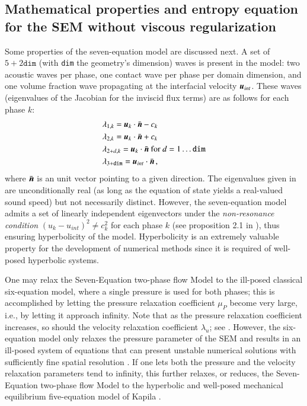 \subsection{Mathematical properties and entropy equation for the SEM without viscous regularization}\label{eq:sem-ent-wv}
Some properties of the seven-equation model are discussed next. A set of $5+2\texttt{dim}$ (with \texttt{dim} the geometry's dimension) waves 
is present in the model: two acoustic waves per phase, one contact wave per phase per domain dimension, and one volume fraction wave propagating 
at the interfacial velocity $\boldsymbol u_{int}$. These waves (eigenvalues of the Jacobian for the inviscid flux terms) are as follows for each phase $k$:
% 
\begin{align}\label{eq:eigenvalues}
&\lambda_{1,k} = \boldsymbol u_k \cdot \bar{\boldsymbol n} - c_k \nonumber\\
&\lambda_{2,k} = \boldsymbol u_k \cdot \bar{\boldsymbol n} + c_k \nonumber\\
&\lambda_{2+d,k} = \boldsymbol u_k \cdot \bar{\boldsymbol n} \text{ for } d = 1 \dots \texttt{dim} \\
&\lambda_{3+\texttt{dim}} = \boldsymbol u_{int} \cdot \bar{\boldsymbol n} \nonumber \,,
\end{align}
%
where $\bar{\boldsymbol n}$ is an unit vector pointing to a given direction. The eigenvalues given in  are unconditionally 
real (as long as the equation of state yields a real-valued sound speed) but not necessarily distinct. However, the seven-equation model admits 
a set of linearly independent eigenvectors under the \emph{non-resonance condition} $(u_k-u_{int})^2 \neq c_k^2$ for each phase $k$ 
(see proposition 2.1 in \cite{coquel_herard}), thus ensuring hyperbolicity of the model.
Hyperbolicity is an extremely valuable property for the development of numerical methods since it is required of well-posed hyperbolic systems.

One may relax the Seven-Equation two-phase flow Model to
the ill-posed classical six-equation model, where a single pressure 
is used for both phases; this is
accomplished by letting the pressure relaxation coefficient $\mu_P$ become
very large, i.e., by letting it approach infinity.  Note that as the pressure
relaxation coefficient increases, so should the velocity
relaxation coefficient $\lambda_u$; see . 
However, the six-equation model only relaxes the pressure parameter of the SEM and results
in an ill-posed system of equations that can present unstable numerical solutions
with sufficiently fine spatial resolution \cite{SEM,Herrard_2005}. 
%
If one lets both the pressure and the velocity relaxation parameters tend to infinity, this further relaxes, or reduces, the
Seven-Equation two-phase flow Model to the hyperbolic and well-posed 
mechanical equilibrium five-equation model of Kapila \cite{Kapila_2001}.  

